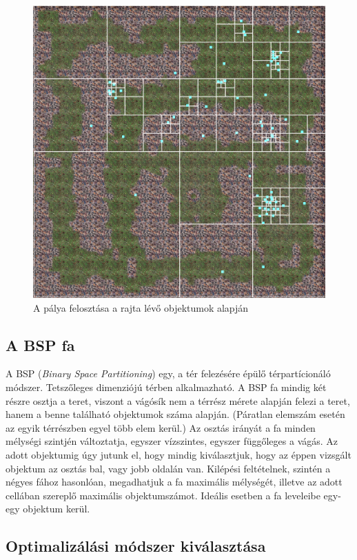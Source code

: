 \begin{figure}[h]
\centering
\includegraphics[scale=0.2]{kepek/quadtree.png}
\caption{A pálya felosztása a rajta lévő objektumok alapján}
\label{fig:quadtree}
\end{figure}

\subsection{A BSP fa}

A BSP (\textit{Binary Space Partitioning}) egy, a tér felezésére épülő térpartícionáló módszer. Tetszőleges dimenziójú térben alkalmazható. A BSP fa mindig két részre osztja a teret, viszont a vágósík nem a térrész mérete alapján felezi a teret, hanem a benne található objektumok száma alapján. (Páratlan elemszám esetén az egyik térrészben egyel több elem kerül.) Az osztás irányát a fa minden mélységi szintjén változtatja, egyszer vízszintes, egyszer függőleges a vágás. Az adott objektumig úgy jutunk el, hogy mindig kiválasztjuk, hogy az éppen vizsgált objektum az osztás bal, vagy jobb oldalán van. Kilépési feltételnek, szintén a négyes fához hasonlóan, megadhatjuk a fa maximális mélységét, illetve az adott cellában szereplő maximális objektumszámot. Ideális esetben a fa leveleibe egy-egy objektum kerül.

\subsection{Optimalizálási módszer kiválasztása}

